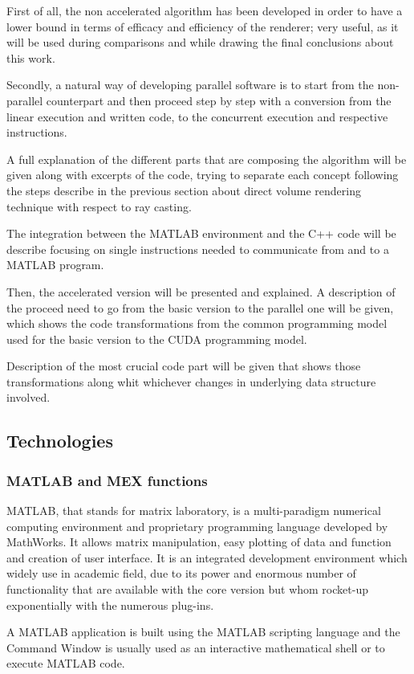 \documentclass[12pt,a4paper]{extarticle}
\newcommand{\linespace}{\vspace{8pt}}
\begin{document}
First of all, the non accelerated algorithm has been developed in order to have a lower bound in terms of efficacy and efficiency of the renderer; very useful, as it will be used during comparisons and while drawing the final conclusions about this work.

Secondly, a natural way of developing parallel software is to start from the non-parallel counterpart and then proceed step by step with a conversion from the linear execution and written code, to the concurrent execution and respective instructions.

A full explanation of the different parts that are composing the algorithm will be given along with excerpts of the code, trying to separate each concept following the steps describe in the previous section about direct volume rendering technique with respect to ray casting.

The integration between the MATLAB environment and the C++ code will be describe focusing on single instructions needed to communicate from and to a MATLAB program.
\linespace

Then, the accelerated version will be presented and explained. A description of the proceed need to go from the basic version to the parallel one will be given, which shows the code transformations from the common programming model used for the basic version to the CUDA programming model. 

Description of the most crucial code part will be given that shows those transformations along whit whichever changes in underlying data structure involved.

\subsection{Technologies} 
\subsubsection{MATLAB and MEX functions}
MATLAB, that stands for matrix laboratory, is a multi-paradigm numerical computing environment and proprietary programming language developed by MathWorks. It allows matrix manipulation, easy plotting of data and function and creation of user interface.
It is an integrated development environment which widely use in academic field, due to its power and enormous number of functionality that are available with the core version but whom rocket-up exponentially with the numerous plug-ins.

A MATLAB application is built using the MATLAB scripting language and the Command Window is usually used as an interactive mathematical shell or to execute MATLAB code.
\linespace
\end{document}
